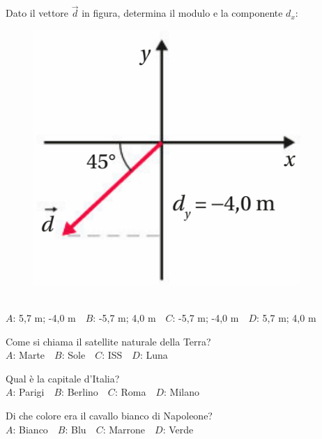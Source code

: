 \mcquestionheader Dato il vettore $\vec{d}$ in figura, determina il modulo e la componente $d_x$: \begin{figure}[h!]   \begin{center}     \includegraphics[scale=0.35]{vettored.png}   \end{center} \end{figure}\\
{$A$}: 5,7 m; -4,0 m\ \ {$B$}: -5,7 m; 4,0 m\ \ {$C$}: -5,7 m; -4,0 m\ \ {$D$}: 5,7 m; 4,0 m\ \ 

\mcquestionfooter



\def\mcquestionnumber{12}


\mcquestionheader Come si chiama il satellite naturale della Terra?\\
{$A$}: Marte\ \ {$B$}: Sole\ \ {$C$}: ISS\ \ {$D$}: Luna\ \ 

\mcquestionfooter



\mcpaperfooter

\def\mcserialnumber{36}
\mcpaperheader


\def\mcquestionnumber{1}


\mcquestionheader Qual è la capitale d’Italia?\\
{$A$}: Parigi\ \ {$B$}: Berlino\ \ {$C$}: Roma\ \ {$D$}: Milano\ \ 

\mcquestionfooter



\def\mcquestionnumber{2}


\mcquestionheader Di che colore era il cavallo bianco di Napoleone?\\
{$A$}: Bianco\ \ {$B$}: Blu\ \ {$C$}: Marrone\ \ {$D$}: Verde\ \ 

